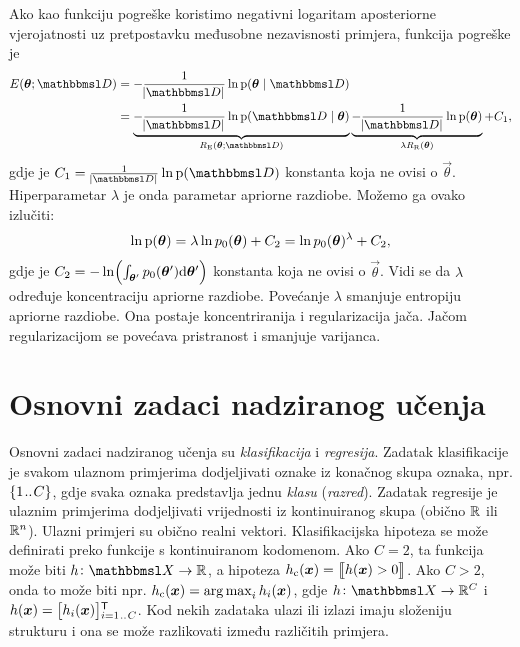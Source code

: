 \documentclass[utf8, diplomski, lmodern]{fer}
\begin{document}
Ako kao funkciju pogreške koristimo negativni logaritam aposteriorne vjerojatnosti uz pretpostavku međusobne nezavisnosti primjera, funkcija pogreške je
\begin{align}
E(\vec\theta;\set{D}) 
&= -\frac{1}{\envert{\set D}}\ln\p(\vec\theta\mid\set{D}) \\
&= 
\underbrace{-\frac{1}{\envert{\set D}}\ln\p(\set{D}\mid\vec\theta)}_{R_\text{E}(\vec\theta;\set{D})}
\underbrace{-\frac{1}{\envert{\set D}}\ln\p(\vec\theta)}_{\lambda R_\text{R}(\vec\theta)} + C_1
\text{,}
\end{align}
gdje je $C_1=\frac{1}{\envert{\set D}}\ln\p(\set D)$ konstanta koja ne ovisi o $\vec\theta$. Hiperparametar $\lambda$ je onda parametar apriorne razdiobe. Možemo ga ovako izlučiti:
\begin{align}
\ln\p(\vec\theta)=\lambda \ln p_0(\vec\theta) +C_2 = \ln p_0(\vec\theta)^\lambda +C_2 \text{,}
\end{align}
gdje je $C_2=-\ln\del{\int_{\vec{\theta'}}p_0(\vec\theta')\dif\vec{\theta'}}$ konstanta koja ne ovisi o $\vec\theta$. Vidi se da $\lambda$ određuje koncentraciju apriorne razdiobe. Povećanje $\lambda$ smanjuje entropiju apriorne razdiobe. Ona postaje koncentriranija i regularizacija jača. Jačom regularizacijom se povećava pristranost i smanjuje varijanca.



\section{Osnovni zadaci nadziranog učenja}

Osnovni zadaci nadziranog učenja su \emph{klasifikacija} i \emph{regresija}. Zadatak klasifikacije je svakom ulaznom primjerima dodjeljivati oznake iz konačnog skupa oznaka, npr. $\cbr{1\bidot C}$, gdje svaka oznaka predstavlja jednu \emph{klasu} (\emph{razred}). Zadatak regresije je ulaznim primjerima dodjeljivati vrijednosti iz kontinuiranog skupa (obično $\mathbb{R}$ ili $\mathbb{R}^n$). Ulazni primjeri su obično realni vektori. Klasifikacijska hipoteza se može definirati preko funkcije s kontinuiranom kodomenom. Ako $C=2$, ta funkcija može biti $\funcdef{h}{\set X}{\R}$, a hipoteza $h_\text{c}(\vec x)=\enbbracket{h(\vec x)>0}$. Ako $C>2$, onda to može biti npr. $h_\text{c}(\vec x)=\argmax_i h_i(\vec x)$, gdje $\funcdef{h}{\set X}{\R^C}$ i $h(\vec x)=\sbr{h_i(\vec x)}_{i=1\bidot C}^\tp$. Kod nekih zadataka ulazi ili izlazi imaju složeniju strukturu i ona se može razlikovati između različitih primjera.
\end{document}

